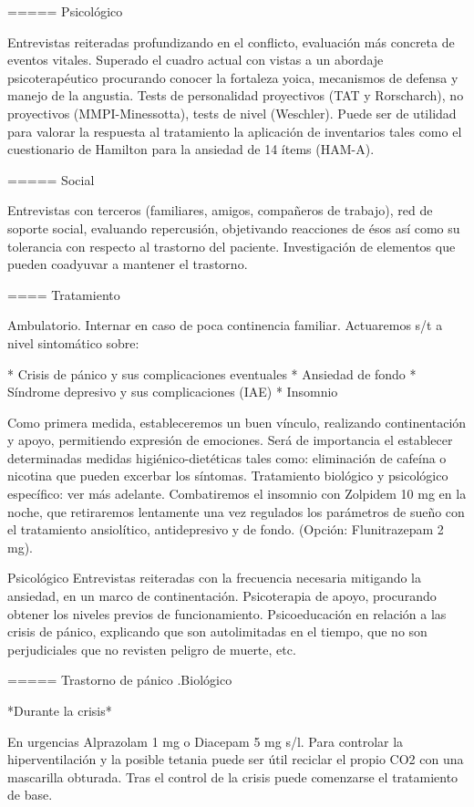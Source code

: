 \documentclass{scrbook}
\begin{document}
===== Psicológico

Entrevistas reiteradas profundizando en el conflicto, evaluación más concreta de eventos vitales. Superado el cuadro actual con vistas a un abordaje psicoterapéutico procurando conocer la fortaleza yoica, mecanismos de defensa y manejo de la angustia. Tests de personalidad proyectivos (TAT y Rorscharch), no proyectivos (MMPI-Minessotta), tests de nivel (Weschler). Puede ser de utilidad para valorar la respuesta al tratamiento la aplicación de inventarios tales como el cuestionario de Hamilton para la ansiedad de 14 ítems (HAM-A).

===== Social

Entrevistas con terceros (familiares, amigos, compañeros de trabajo), red de soporte social, evaluando repercusión, objetivando reacciones de ésos así como su tolerancia con respecto al trastorno del paciente. Investigación de elementos que pueden coadyuvar a mantener el trastorno.

==== Tratamiento

Ambulatorio. Internar en caso de poca continencia familiar. Actuaremos s/t a nivel sintomático sobre:

* Crisis de pánico y sus complicaciones eventuales
* Ansiedad de fondo
* Síndrome depresivo y sus complicaciones (IAE)
* Insomnio

Como primera medida, estableceremos un buen vínculo, realizando continentación y apoyo, permitiendo expresión de emociones. Será de importancia el establecer determinadas medidas higiénico-dietéticas tales como: eliminación de cafeína o nicotina que pueden excerbar los síntomas. Tratamiento biológico y psicológico específico: ver más adelante. Combatiremos el insomnio con Zolpidem 10 mg en la noche, que retiraremos lentamente una vez regulados los parámetros de sueño con el tratamiento ansiolítico, antidepresivo y de fondo. (Opción: Flunitrazepam 2 mg).

Psicológico Entrevistas reiteradas con la frecuencia necesaria mitigando la ansiedad, en un marco de continentación. Psicoterapia de apoyo, procurando obtener los niveles previos de funcionamiento. Psicoeducación en relación a las crisis de pánico, explicando que son autolimitadas en el tiempo, que no son perjudiciales que no revisten peligro de muerte, etc.

===== Trastorno de pánico
.Biológico

*Durante la crisis*

En urgencias Alprazolam 1 mg o Diacepam 5 mg s/l. Para controlar la hiperventilación y la posible tetania puede ser útil reciclar el propio CO2 con una mascarilla obturada. Tras el control de la crisis puede comenzarse el tratamiento de base.
\end{document}
